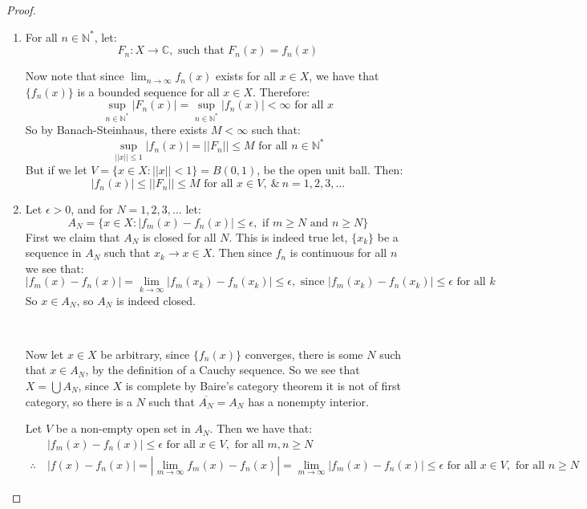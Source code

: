 \documentclass{article}
\newcommand{\C}{\mathbb{C}}
\newcommand{\N}{\mathbb{N}}
\theoremstyle{definition}
\theoremstyle{remark}
\theoremstyle{definition}
\begin{document}
\begin{proof}
    \begin{enumerate}[label = (\alph*)]
        \item For all $n\in \N^\ast$, let:\begin{equation}
            F_n\colon X\rightarrow \C, \text{ such that }F_n(x) = f_n(x)
        \end{equation}   

        Now note that since $\lim_{n\rightarrow\infty}f_n(x)$ exists for all $x\in X$, we have that $\{f_n(x)\}$ is a bounded sequence for all 
        $x\in X$. Therefore:\begin{equation}
            \sup_{n\in\N^\ast}|F_n(x)| = \sup_{n\in\N^\ast}|f_n(x)|<\infty \text{ for all }x 
        \end{equation}
        So by Banach-Steinhaus, there exists $M<\infty$ such that:\begin{equation}
            \sup_{||x||\leq 1}|f_n(x)| = ||F_n||\leq M \text{ for all }n\in \N^\ast
        \end{equation}
        But if we let $V = \{x\in X\colon ||x||< 1\} = B(0,1)$, be the open unit ball. Then:\begin{equation}
            |f_n(x)|\leq ||F_n||\leq M \text{ for all }x\in V, \ \& \ n=1,2,3,\dots
        \end{equation}
        \item Let $\epsilon>0$, and for $N=1,2,3,\dots$ let:\begin{equation}
            A_N = \{x\in X \colon |f_m(x)-f_n(x)|\leq \epsilon, \text{ if }m\geq N \text{ and }n\geq N \}
        \end{equation}
First we claim that $A_N$ is closed for all $N$. This is indeed true let, $\{x_k\}$ be a sequence in $A_N$ such that $x_k\rightarrow x\in X$.
Then since $f_n$ is continuous for all $n$ we see that:\begin{equation}
    |f_m(x)-f_n(x)| = \lim_{k\rightarrow\infty}|f_m(x_k)-f_n(x_k)|\leq \epsilon, \text{ since } |f_m(x_k)-f_n(x_k)|\leq \epsilon\text{ for all }k
\end{equation} 
So $x\in A_N$, so $A_N$ is indeed closed.

\


Now let $x\in X$ be arbitrary, since $\{f_n(x)\}$ converges, there is some $N$ such that $x\in A_N$, by the definition of a Cauchy sequence.
So we see that $X=\bigcup A_N$, since $X$ is complete by Baire's category theorem it is not of first category, so there is a $N$ 
such that $\overline{A_N} = A_N$ has a nonempty interior.

Let $V$ be a non-empty open set in  $A_N$. Then we have that:\begin{align*}
    &|f_m(x)-f_n(x)|\leq \epsilon \text{ for all }x\in V, \text{ for all }m,n\geq N\\
    \therefore \ &|f(x)-f_n(x)| = |\lim_{m\rightarrow\infty}f_m(x)-f_n(x)| = \lim_{m\rightarrow\infty}|f_m(x)-f_n(x)|\leq \epsilon  \text{ for all }x\in V, \text{ for all }n\geq N
\end{align*}

    \end{enumerate}
\end{proof}
    
\end{document}

